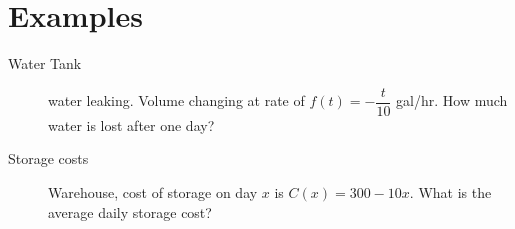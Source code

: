 \documentclass[11pt]{article}
\begin{document}
\section*{Examples}
\begin{description}
\item[Water Tank] water leaking. Volume changing at rate of
  $f(t)=-\dfrac{t}{10}$ gal/hr.  How much water is lost after one day?
\item[Storage costs]  Warehouse, cost of storage on day $x$ is
  $C(x)=300-10x$.  What is the average daily storage cost?
\end{description}
\end{document}
